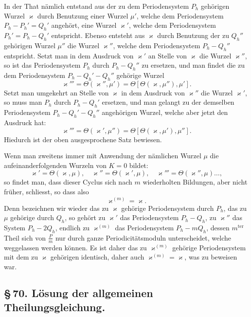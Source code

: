 \documentclass[10pt]{article}
\begin{document}
In der That nämlich entstand aus der zu dem Periodensystem \(P_h\) gehörigen Wurzel \(\varkappa\) durch Benutzung einer Wurzel \(\mu'\), welche dem Periodensystem \(P_h-P_h'=Q_h'\) angehört, eine Wurzel \(\varkappa'\), welche dem Periodensystem \(P_h'=P_h-Q_h'\) entspricht. Ebenso entsteht aus \(\varkappa\) durch Benutzung der zu \(Q_h''\) gehörigen Wurzel \(\mu''\) die Wurzel \(\varkappa''\), welche dem Periodensystem \(P_h-Q_h''\) entspricht. Setzt man in dem Ausdruck von \(\varkappa'\) an Stelle von \(\varkappa\) die Wurzel \(\varkappa''\), so ist das Periodensystem \(P_h\) durch \(P_h-Q_h''\) zu ersetzen, und man findet die zu dem Periodensystem \(P_h-Q_h'-Q_h''\) gehörige Wurzel
\[
\varkappa'''=\Theta(\varkappa'',\mu')=\Theta[\Theta(\varkappa,\mu''),\mu'].
\]
Setzt man umgekehrt an Stelle von \(\varkappa\) in dem Ausdruck von \(\varkappa''\) die Wurzel \(\varkappa'\), so muss man \(P_h\) durch \(P_h-Q_h'\) ersetzen, und man gelangt zu der demselben Periodensystem \(P_h-Q_h'-Q_h''\) angehörigen Wurzel, welche aber jetzt den Ausdruck hat:
\[
\varkappa'''=\Theta(\varkappa',\mu'')=\Theta[\Theta(\varkappa,\mu'),\mu''].
\]
Hiedurch ist der oben ausgesprochene Satz bewiesen.

Wenn man zweitens immer mit Anwendung der nämlichen Wurzel \(\mu\) die aufeinanderfolgenden Wurzeln von \(K=0\) bildet:
\[
\varkappa'=\Theta(\varkappa,\mu),\quad
\varkappa''=\Theta(\varkappa',\mu),\quad
\varkappa'''=\Theta(\varkappa'',\mu)\ldots,
\]
so findet man, dass dieser Cyclus sich nach \(m\) wiederholten Bildungen, aber nicht früher, schliesst, so dass also
\[
\varkappa^{(m)}=\varkappa.
\]
Denn bezeichnen wir wieder das zu \(\varkappa\) gehörige Periodensystem durch \(P_h\), das zu \(\mu\) gehörige durch \(Q_h\), so gehört zu \(\varkappa'\) das Periodensystem \(P_h-Q_h\), zu \(\varkappa''\) das System \(P_h-2Q_h\), endlich zu \(\varkappa^{(m)}\) das Periodensystem \(P_h-mQ_h\), dessen \(m^{\text{ter}}\) Theil sich von \(\frac{P}{m}\) nur durch ganze Periodicitätsmoduln unterscheidet, welche weggelassen werden können. Es ist daher das zu \(\varkappa^{(m)}\) gehörige Periodensystem mit dem zu \(\varkappa\) gehörigen identisch, daher auch \(\varkappa^{(m)}=\varkappa\), was zu beweisen war.

\subsection*{\S\,70. Lösung der allgemeinen Theilungsgleichung.}
\end{document}
